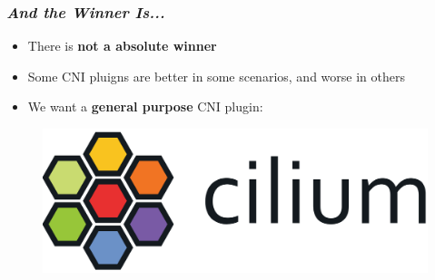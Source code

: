 \begin{frame}
  \frametitle{ \textit{And the Winner Is...}}
  \begin{itemize}
    \item There is \alert{\textbf{not a absolute winner}}
    \item Some CNI pluigns are better in some scenarios, and worse in others
    \item We want a \alert{\textbf{general purpose}} CNI plugin:
  \end{itemize}
  \pause
  \vspace{1em}
  \begin{figure}
    \centering
    \includegraphics[width=.65\textwidth]{img/cnis/cilium-logo}
  \end{figure}
\end{frame}

